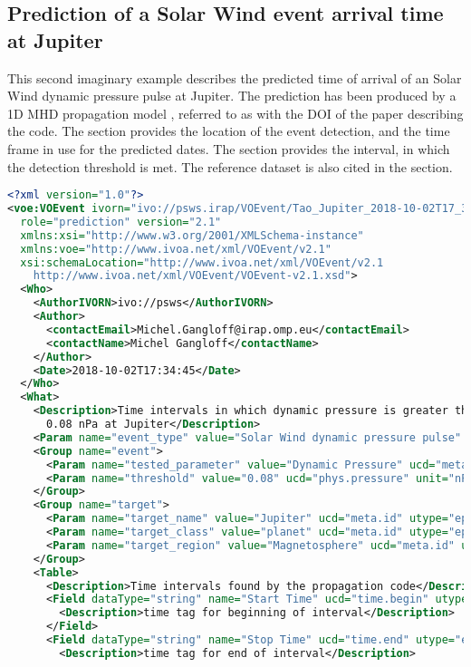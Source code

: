 \documentclass[11pt,a4paper]{ivoa}
\begin{document}
\subsection{Prediction of a Solar Wind event arrival time at Jupiter}
This second imaginary example describes the predicted time of arrival of
an Solar Wind dynamic pressure pulse at Jupiter. The prediction has been
produced by a 1D MHD propagation model \cite{tao05}, referred to as with
the DOI of the paper describing the code. The  section provides
the location of the event detection, and the time frame in use for the
predicted dates. The  section provides the interval, in which the
detection threshold is met. The reference dataset is also cited in the
 section.
\begin{lstlisting}[language=XML]
<?xml version="1.0"?>
<voe:VOEvent ivorn="ivo://psws.irap/VOEvent/Tao_Jupiter_2018-10-02T17_34_45::v1.0"
  role="prediction" version="2.1"
  xmlns:xsi="http://www.w3.org/2001/XMLSchema-instance"
  xmlns:voe="http://www.ivoa.net/xml/VOEvent/v2.1"
  xsi:schemaLocation="http://www.ivoa.net/xml/VOEvent/v2.1
    http://www.ivoa.net/xml/VOEvent/VOEvent-v2.1.xsd">
  <Who>
    <AuthorIVORN>ivo://psws</AuthorIVORN>
    <Author>
      <contactEmail>Michel.Gangloff@irap.omp.eu</contactEmail>
      <contactName>Michel Gangloff</contactName>
    </Author>
    <Date>2018-10-02T17:34:45</Date>
  </Who>
  <What>
    <Description>Time intervals in which dynamic pressure is greater than
      0.08 nPa at Jupiter</Description>
    <Param name="event_type" value="Solar Wind dynamic pressure pulse" ucd="meta.id"/>
    <Group name="event">
      <Param name="tested_parameter" value="Dynamic Pressure" ucd="meta.id" dataType="string"/>
      <Param name="threshold" value="0.08" ucd="phys.pressure" unit="nPa" dataType="string"/>
    </Group>
    <Group name="target">
      <Param name="target_name" value="Jupiter" ucd="meta.id" utype="epn:target_name"/>
      <Param name="target_class" value="planet" ucd="meta.id" utype="epn:target_class"/>
      <Param name="target_region" value="Magnetosphere" ucd="meta.id" utype="epn:target_region"/>
    </Group>
    <Table>
      <Description>Time intervals found by the propagation code</Description>
      <Field dataType="string" name="Start Time" ucd="time.begin" utype="epn:time_min">
        <Description>time tag for beginning of interval</Description>
      </Field>
      <Field dataType="string" name="Stop Time" ucd="time.end" utype="epn:time_max">
        <Description>time tag for end of interval</Description>

\end{lstlisting}
\end{document}

